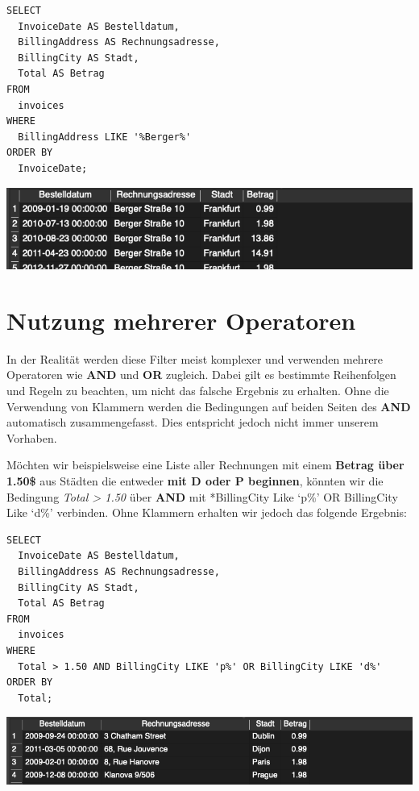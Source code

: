 \documentclass[
]{book}
\begin{document}
\begin{verbatim}
SELECT
  InvoiceDate AS Bestelldatum,
  BillingAddress AS Rechnungsadresse,
  BillingCity AS Stadt,
  Total AS Betrag
FROM
  invoices
WHERE
  BillingAddress LIKE '%Berger%'
ORDER BY
  InvoiceDate;
\end{verbatim}

\includegraphics[width=10.41667in,height=\textheight]{img-WHERE5.png}

\hypertarget{nutzung-mehrerer-operatoren}{%
\section{Nutzung mehrerer Operatoren}\label{nutzung-mehrerer-operatoren}}

In der Realität werden diese Filter meist komplexer und verwenden mehrere Operatoren wie \textbf{AND} und \textbf{OR} zugleich. Dabei gilt es bestimmte Reihenfolgen und Regeln zu beachten, um nicht das falsche Ergebnis zu erhalten. Ohne die Verwendung von Klammern werden die Bedingungen auf beiden Seiten des \textbf{AND} automatisch zusammengefasst. Dies entspricht jedoch nicht immer unserem Vorhaben.

Möchten wir beispielsweise eine Liste aller Rechnungen mit einem \textbf{Betrag über 1.50\$} aus Städten die entweder \textbf{mit D oder P beginnen}, könnten wir die Bedingung \emph{Total \textgreater{} 1.50} über \textbf{AND} mit *BillingCity Like `p\%' OR BillingCity Like `d\%' verbinden. Ohne Klammern erhalten wir jedoch das folgende Ergebnis:

\begin{verbatim}
SELECT
  InvoiceDate AS Bestelldatum,
  BillingAddress AS Rechnungsadresse,
  BillingCity AS Stadt,
  Total AS Betrag
FROM
  invoices
WHERE
  Total > 1.50 AND BillingCity LIKE 'p%' OR BillingCity LIKE 'd%'
ORDER BY
  Total;
\end{verbatim}

\includegraphics[width=10.41667in,height=\textheight]{img-WHERE6.png}
\end{document}
